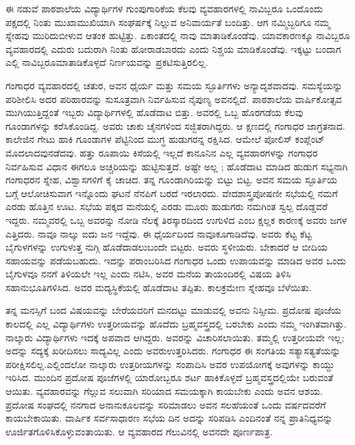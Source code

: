 {ಈ ನಡುವೆ ಪಾಠಶಾಲೆಯ ವಿದ್ಯಾರ್ಥಿಗಳ ಗುಂಪುಗಾರಿಕೆಯ ಕೆಲವು ವ್ಯವಹಾರ\-ಗಳಲ್ಲಿ ನಾವಿಬ್ಬರೂ ಒಂದೊಂದು ಪಕ್ಷದಲ್ಲಿ ನಿಂತು ಮುಖಾಮುಖಿಯಾಗಿ \-ಸಂಘರ್ಷಕ್ಕೆ ನಿಲ್ಲುವ  ಅನಿವಾರ್ಯತೆ ಬಂದಿತ್ತು. ಆಗ ನಮ್ಮಿಬ್ಬರಿಗೂ ನಮ್ಮ ಸ್ನೇಹವು ಮುರಿದು\break ಬೀಳುವ ಆತಂಕ ಹುಟ್ಟಿತ್ತು. ಏಕಾಂತದಲ್ಲಿ ನಾವು ಮಾತಾಡಿಕೊಂಡೆವು. ಯಾವ\break ಕಾರಣಕ್ಕೂ ನಾವಿಬ್ಬರೂ ವ್ಯವಹಾರದಲ್ಲಿ ಎದುರು ಬದುರಾಗಿ ನಿಂತು ಹೋರಾಡ\-ಬಾರದು ಎಂದು ನಿಶ್ಚಯ ಮಾಡಿಕೊಂಡೆವು. ಇಕ್ಕಟ್ಟು ಬಂದಾಗ ಎಲ್ಲಿ ನಾವಿಬ್ಬರೂ\break ಮಾತಾಡಿಕೊಳ್ಳದೆ ನಿರ್ಣಯವನ್ನು ಪ್ರಕಟಿಸುತ್ತಿರಲಿಲ್ಲ. 

ಗಂಗಾಧರ ವ್ಯವಹಾರದಲ್ಲಿ ಚತುರ, ಅವನ ಧೈರ್ಯ ಮತ್ತು ಸಮಯ ಸ್ಫೂರ್ತಿ\-ಗಳು ಅನ್ಯಾದೃಶವಾದವು. ಸಮಸ್ಯೆಯನ್ನು ಪರಿಶೀಲಿಸಿ ಅದರ ಪರಿಹಾರವನ್ನು ಸುಸೂತ್ರ\-ವಾಗಿ ನಿರ್ವಹಿಸುವ ನೈಪುಣ್ಯ ಅವನಲ್ಲಿದೆ. ಪಾಠಶಾಲೆಯ ವಾರ್ಷಿಕೋತ್ಸವ ಮುಗಿಯು\-ತ್ತಿದ್ದಂತೆ ಇಬ್ಬರು ವಿದ್ಯಾರ್ಥಿಗಳಲ್ಲಿ ಹೊಡೆದಾಟ ಬಿತ್ತು. ಅವರಲ್ಲಿ ಒಬ್ಬ ಹೊರಗಡೆಯ ಕೆಲವು ಗೂಂಡಾಗಳನ್ನು ಕರೆಸಿಕೊಂಡಿದ್ದ. ಅವರು ಚಾಕು ಚೈನಗಳಿಂದ ಸಜ್ಜಿತರಾಗಿದ್ದರು. ಆ ಕ್ಷಣದಲ್ಲಿ ಗಂಗಾಧರ ಜಾಗ್ರತನಾದ. ಕಾಲೇಜಿನ ಗೇಟು ಹಾಕಿ ಗೂಂಡಾಗಳ ಪೆಟ್ಟಿನಿಂದ ಮುಗ್ಧ ಹುಡುಗರನ್ನ ರಕ್ಷಿಸಿದ. ಆಮೇಲೆ ಪೋಲಿಸ್ ಕಂಪ್ಲೆಂಟ್ ಮೊದಲಾದವು\break ನಡೆದವು. ಹತ್ತು ರೂಪಾಯಿ ಕಿಸೆಯಲ್ಲಿ ಇಲ್ಲದೆ ಕಾನೂನಿನ ಎಲ್ಲ ವ್ಯವಹಾರಗಳನ್ನು ಗಂಗಾಧರ   ನಿರ್ವಹಿಸುವ ವಿಧಾನ ಈಗಲೂ ಅಚ್ಚರಿಯನ್ನು ಹುಟ್ಟಿಸುತ್ತದೆ. ಅಷ್ಟೇ ಅಲ್ಲ ; ಹೊಡೆದಾಟ ಮಾಡಿದ ಹುಡುಗ ಸಭ್ಯನಾಗಿ ಗಂಗಾಧರನ ಸ್ನೇಹ, ವಿಶ್ವಾಸಗಳಿಗೆ ಕೈ ಚಾಚಿದ.  ತನ್ನ ಗೂಂಡಾಗಿರಿಯನ್ನು ಬಿಟ್ಟು ಬಿಟ್ಟ. ಅವನ ಸಮಯ ಸ್ಫೂರ್ತಿಯ ಬಗ್ಗೆ ಆಲೋಚಿಸುವಾಗ ಇನ್ನೊಂದು ಘಟನೆ ನೆನಪಿಗೆ ಬರದೆ ಇರಲಾರದು. ವೇದಶಾಸ್ತ್ರ\break ಪೋಷಣೀ ಸಭೆಯಲ್ಲಿ ನಮಗೆ ಎರಡು ಹೊತ್ತಿನ ಊಟ. ಸಭೆಯ ಪಕ್ಕದ ಮನೆಯಲ್ಲಿ ಎರಡು ಮೂರು ಹುಡುಗರು ನಮಗಿಂತ ಸ್ವಲ್ಪ ದೊಡ್ಡವರೆ ಇದ್ದರು. ನಮ್ಮವರಲ್ಲಿ ಒಬ್ಬ ಅವರನ್ನು ನೋಡಿ ನೆಲಕ್ಕೆ ತಿರಸ್ಕಾರದಿಂದ ಉಗುಳಿದ ಎಂಬ ಕ್ಷಲ್ಲಕ ಕಾರಣಕ್ಕೆ ಅವರು ಜಗಳ ಎತ್ತಿದರು. ನಾವೂ ನಾಲ್ಕು ಐದು ಜನ ಇದ್ದೆವು. ಈ ಧೈರ್ಯದಿಂದ ನಾವೂ\break ಕೂಗಾಡಿದೆವು. ಅವರು ಕೆಟ್ಟ ಕೆಟ್ಟ ಬೈಗುಳಗಳನ್ನು ಉಗುಳುತ್ತ ನುಗ್ಗಿ ಹೊಡೆದಾಡಲು\break ಬಂದೇ ಬಿಟ್ಟರು. ಅವರು ಸ್ಥಳೀಯರು. ಬೇಕಾದರೆ ಆ ಬೀದಿಯ ಸಹಾಯವನ್ನು ಪಡೆಯ\-ಬಹುದು. ಇದನ್ನು ಪರಾಂಬರಿಸಿದ ಗಂಗಾಧರ ಒಂದು ಉಪಾಯವನ್ನು ಮಾಡಿದ ಅವರ ಒಂದು ಬೈಗುಳವೂ ನನಗೆ ತಿಳಿಯಲೇ ಇಲ್ಲ ಎಂದು ನಟಿಸಿ, ಅವರ ಮನೆಯ ತಾಯಂದಿರಲ್ಲಿ ವಿಷಯ ತಿಳಿಸಿ ಸಹಾನುಭೂತಿಗಳಿಸಿದ. ಅವರ ಮದ್ಯಸ್ಥಿಕೆ\-ಯಲ್ಲಿ ಹೊಡೆದಾಟ ತಪ್ಪಿತು. ಕಾಲಕ್ರಮೇಣ ಸ್ನೇಹವೂ ಬೆಳೆಯಿತು. 

ತನ್ನ  ಮನಸ್ಸಿಗೆ ಬಂದ ವಿಷಯವನ್ನು ಬೇರೆಯವರಿಗೆ ಮನದಟ್ಟು ಮಾಡುವಲ್ಲಿ ಅವನು ನಿಸ್ಸೀಮ. ಪ್ರದೋಷ ಪೂಜೆಯ ಕಾಲದಲ್ಲಿ ಎಲ್ಲ ವಿದ್ಯಾರ್ಥಿಗಳು ಉತ್ತರೀಯವನ್ನು ಹೊದೆದು ಬ್ರಹ್ಮವಸ್ತ್ರದಲ್ಲಿ ಬರಬೇಕು ಎಂದು ನಮ್ಮ ಇಂಗಿತವಾಗಿತ್ತು. ನಾಲ್ಕಾರು ವಿದ್ಯಾರ್ಥಿಗಳು ಇದಕ್ಕೆ ಅಪವಾದ ಆಗಿದ್ದರು. ಅವರನ್ನು ವಿಚಾರಿಸಲಾಯಿತು. ತಮ್ಮಲ್ಲಿ ಉತ್ತರೀಯವೇ ಇಲ್ಲ; ಅದನ್ನು ಸದ್ಯಕ್ಕೆ ಖರೀದಿಸಲು ಸಾದ್ಯವಿಲ್ಲ ಎಂದು ಅವರು\break ಉತ್ತರಿಸಿದರು. ಗಂಗಾಧರ ಈ ಸಂಗತಿಯ ಸತ್ಯಾಸತ್ಯತೆಯನ್ನು ಪರೀಕ್ಷಿಸಲಿಲ್ಲ.\break ಎಲ್ಲಿಂದಲೋ ನಾಲ್ಕಾರು ಉತ್ತರೀಯಗಳನ್ನು ಸಂಪಾದಿಸಿ ಅವರ   ಉಪಯೋಗಕ್ಕೆ ಅವು\-ಗಳನ್ನು ಕಾಯ್ದು ಇರಿಸಿದ. ಮುಂದಿನ ಪ್ರದೋಷ ಪೂಜೆಗಳಲ್ಲಿ  ಯಾರೋಬ್ಬರೂ ಶರ್ಟ ಹಾಕಿಕೊಳ್ಳದೆ ಬ್ರಹ್ಮವಸ್ತ್ರದಲ್ಲಿಯೇ ಬರುವಂತೆ ಆಯಿತು. ವ್ಯವಹಾರವನ್ನು ಗೆಲ್ಲುವ ಸಲುವಾಗಿ ಸರಿಯಾದ ಸಮಯಕ್ಕಾಗಿ ಕಾಯಬೇಕು ಎಂದು ಅವನ ಆಶಯ. ಪ್ರದೋಷ ಸಂಘದಲ್ಲಿ ನನಗಾದ  ಅನಾನುಕೂಲವನ್ನು ಸರಿಮಾಡಲು ಅವನ ಸಲಹೆಯಂತೆ ಒಂದು ವರ್ಷದವರೆಗೆ ಕಾಯಬೇಕಾಯಿತು. ವಾರ್ಷಿಕ ಸರ್ವಸಾಧಾರಣ ಸಭೆಯ ದಿನ ಅದನ್ನು ಸರಿಪಡಿಸಿ ಎಂದಿನಂತೆ ನನ್ನ ಪ್ರಾತಿನಿಧ್ಯವನ್ನು ಊರ್ಜಿತಗೊಳಿಸಿಕೊಳ್ಳುವಂತಾಯಿತು.  ಆ ವ್ಯವಹಾರದ ಗೆಲುವಿನಲ್ಲಿ ಅವನದೇ ಪೂರ್ಣಪಾತ್ರ. 

}
